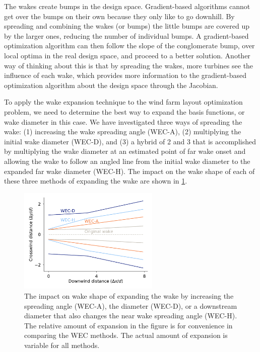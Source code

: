 \documentclass[journal abbreviation, manuscript]{copernicus}
\begin{document}
	The wakes create bumps in the design space. Gradient-based algorithms cannot get over the bumps on their own because they only like to go downhill. By spreading and combining the wakes (or bumps) the little bumps are covered up by the larger ones, reducing the number of individual bumps. A gradient-based optimization algorithm can then follow the slope of the conglomerate bump, over local optima in the real design space, and proceed to a better solution. Another way of thinking about this is that by spreading the wakes, more turbines see the influence of each wake, which provides more information to the gradient-based optimization algorithm about the design space through the Jacobian. 
	
	To apply the wake expansion technique to the wind farm layout optimization problem, we need to determine the best way to expand the basis functions, or wake diameter in this case. We have investigated three ways of spreading the wake: (1) increasing the wake spreading angle (WEC-A), (2) multiplying the initial wake diameter (WEC-D), and (3) a hybrid of 2 and 3 that is accomplished by multiplying the wake diameter at an estimated point of far wake onset and allowing the wake to follow an angled line from the initial wake diameter to the expanded far wake diameter (WEC-H). The impact on the wake shape of each of these three methods of expanding the wake are shown in \ref{fig:wec-methods}.
	
	\begin{figure}[h]
		\centering
		\includegraphics[width=0.6\textwidth,trim={0, 0, 0, 2.0}]{wec-methods}
		\caption{The impact on wake shape of expanding the wake by increasing the spreading angle (WEC-A), the diameter (WEC-D), or a downstream diameter that also changes the near wake spreading angle (WEC-H). The relative amount of expansion in the figure is for convenience in comparing the WEC methods. The actual amount of expansion is variable for all methods.}
		\label{fig:wec-methods}
	\end{figure}
	
\end{document}
